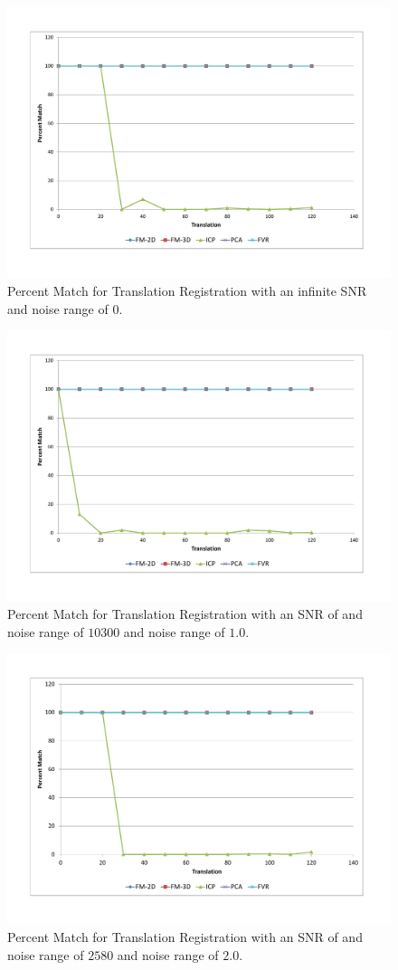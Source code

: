 \begin{figure}[t]
\centering
\includegraphics[width=6.0in]{images/results/noise/TransNoise0}
\caption{Percent Match for Translation Registration with an infinite SNR and noise range of $0$.}
\label{fig:TNoise0}
\end{figure}


\begin{figure}[t]
\centering
\includegraphics[width=6.0in]{images/results/noise/TransNoise1}
\caption{Percent Match for Translation Registration with an SNR of and noise range of $10300$ and noise range of $1.0$.}
\label{fig:TNoise1}
\end{figure}


\begin{figure}[t]
\centering
\includegraphics[width=6.0in]{images/results/noise/TransNoise2}
\caption{Percent Match for Translation Registration with an SNR of and noise range of $2580$ and noise range of $2.0$.}
\label{fig:TNoise2}
\end{figure}